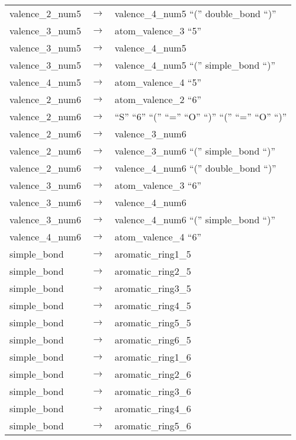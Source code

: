 \begin{longtable}{m{} p{} p{}}
    valence\_2\_num5 & $\rightarrow$ & valence\_4\_num5 ``('' double\_bond ``)'' \\
    valence\_3\_num5 & $\rightarrow$ & atom\_valence\_3 ``5'' \\
    valence\_3\_num5 & $\rightarrow$ & valence\_4\_num5 \\
    valence\_3\_num5 & $\rightarrow$ & valence\_4\_num5 ``('' simple\_bond ``)'' \\
    valence\_4\_num5 & $\rightarrow$ & atom\_valence\_4 ``5'' \\
    valence\_2\_num6 & $\rightarrow$ & atom\_valence\_2 ``6'' \\
    valence\_2\_num6 & $\rightarrow$ & ``S'' ``6'' ``('' ``='' ``O'' ``)'' ``('' ``='' ``O'' ``)'' \\
    valence\_2\_num6 & $\rightarrow$ & valence\_3\_num6 \\
    valence\_2\_num6 & $\rightarrow$ & valence\_3\_num6 ``('' simple\_bond ``)'' \\
    valence\_2\_num6 & $\rightarrow$ & valence\_4\_num6 ``('' double\_bond ``)'' \\
    valence\_3\_num6 & $\rightarrow$ & atom\_valence\_3 ``6'' \\
    valence\_3\_num6 & $\rightarrow$ & valence\_4\_num6 \\
    valence\_3\_num6 & $\rightarrow$ & valence\_4\_num6 ``('' simple\_bond ``)'' \\
    valence\_4\_num6 & $\rightarrow$ & atom\_valence\_4 ``6'' \\
    simple\_bond & $\rightarrow$ & aromatic\_ring1\_5 \\
    simple\_bond & $\rightarrow$ & aromatic\_ring2\_5 \\
    simple\_bond & $\rightarrow$ & aromatic\_ring3\_5 \\
    simple\_bond & $\rightarrow$ & aromatic\_ring4\_5 \\
    simple\_bond & $\rightarrow$ & aromatic\_ring5\_5 \\
    simple\_bond & $\rightarrow$ & aromatic\_ring6\_5 \\
    simple\_bond & $\rightarrow$ & aromatic\_ring1\_6 \\
    simple\_bond & $\rightarrow$ & aromatic\_ring2\_6 \\
    simple\_bond & $\rightarrow$ & aromatic\_ring3\_6 \\
    simple\_bond & $\rightarrow$ & aromatic\_ring4\_6 \\
    simple\_bond & $\rightarrow$ & aromatic\_ring5\_6 \\

\end{longtable}
